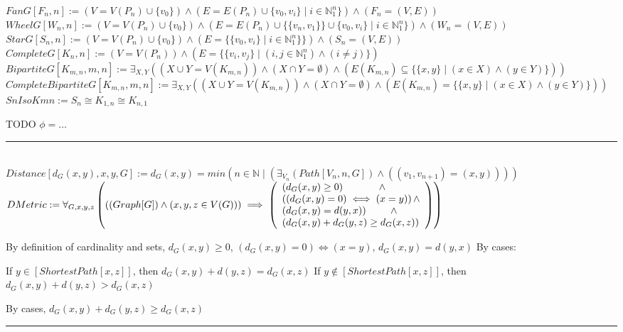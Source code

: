 \documentclass{book}
\newcommand{\abr}{:=}
\newcommand{\pr}[1]{\left(#1\right)}
\newcommand{\st}{\mathbin{|}}
\newcommand{\utup}[1]{\{#1\}}
\begin{document}
$FanG[F_n, n] \abr \pr{V = V(P_n) \cup \{v_0\}} \land \pr{E = E(P_n) \cup \utup{v_0, v_i} \st i \in \mathbb{N}_1^n\}} \land \pr{F_n = (V, E)}$ \\
$WheelG[W_n, n] \abr \pr{V = V(P_n) \cup \{v_0\}} \land \pr{E = E(P_n) \cup \{\utup{v_n, v_1}\} \cup \utup{v_0, v_i} \st i \in \mathbb{N}_1^n\}} \land \pr{W_n = (V, E)}$ \\
$StarG[S_n, n] \abr \pr{V = V(P_n) \cup \{v_0\}} \land (E = \{\utup{v_0, v_i} \st i \in \mathbb{N}_1^n\}\}) \land \pr{S_n = (V, E)}$ \\
$CompleteG[K_n, n] \abr \pr{V = V(P_n)} \land \pr{E = \{\utup{v_i, v_j} \st (i, j \in \mathbb{N}_1^n) \land (i \neq j)\}}$ \\
$BipartiteG[K_{m, n}, m, n] \abr \exists_{X, Y}\pr{\pr{X \cup Y = V(K_{m, n})} \land (X \cap Y = \emptyset) \land \pr{E(K_{m, n}) \subseteq \{\utup{x, y} \st (x \in X) \land (y \in Y)\}}}$ \\
$CompleteBipartiteG[K_{m, n}, m, n] \abr \exists_{X, Y}\pr{\pr{X \cup Y = V(K_{m, n})} \land (X \cap Y = \emptyset) \land \pr{E(K_{m, n}) = \{\utup{x, y} \st (x \in X) \land (y \in Y)\}}}$ \\

$SnIsoKmn \abr S_n \cong K_{1, n} \cong K_{n, 1}$
\begin{enumerate}
  \lit TODO $\phi = \ldots$
\end{enumerate} \vspace{.75mm} \hrule \vspace{.75mm} \ \\


$Distance[d_G(x, y), x, y, G] \abr d_G(x, y) = min\pr{{n \in \mathbb{N} \st \pr{\exists_{V_n}(Path[V_n, n, G]) \land \pr{(v_1, v_{n + 1}) = (x, y)}}}}$ \\
$DMetric \abr \forall_{G, x, y, z}\pr{\pr{(Graph[G]) \land \pr{x, y, z \in V(G)}} \implies 
\left(\begin{array}{ll}
  \pr{d_G(x, y) \geq 0} \hfill \land \hfill \\
  \pr{\pr{d_G(x, y) = 0} \iff (x = y)} \hfill \land \hfill \\
  \pr{d_G(x, y) = d(y, x)} \hfill \land \hfill \\
  \pr{d_G(x, y) + d_G(y, z) \geq d_G(x, z)} \\
\end{array}\right)}$ \\
\begin{enumerate}
  \lit By definition of cardinality and sets, $d_G(x, y) \geq 0$, $\pr{d_G(x, y) = 0} \iff (x = y)$, $d_G(x, y) = d(y, x)$
  \lit By cases:
  \begin{enumerate}
    \lit If $y \in [ShortestPath[x, z]]$, then $d_G(x, y) + d(y, z) = d_G(x, z)$
    \lit If $y \notin [ShortestPath[x, z]]$, then $d_G(x, y) + d(y, z) > d_G(x, z)$
  \end{enumerate}
  \lit By cases, $d_G(x, y) + d_G(y, z) \geq d_G(x, z)$
\end{enumerate} \vspace{.75mm} \hrule \vspace{.75mm} \ \\
\end{document}
